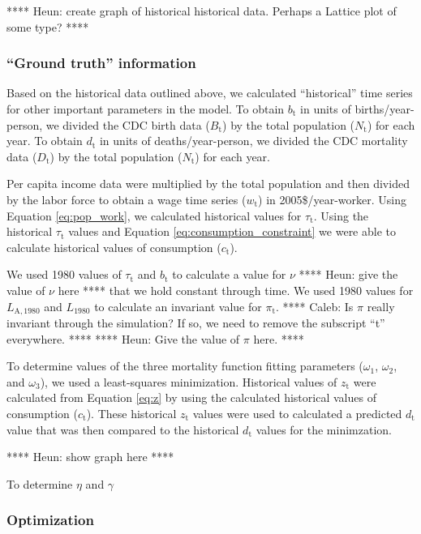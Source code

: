 \documentclass[letterpaper,12pt]{article}
\begin{document}
**** Heun: create graph of historical historical data. Perhaps a Lattice plot of some type? ****

\subsubsection{``Ground truth'' information}
Based on the historical data outlined above, we calculated ``historical'' time series for other important parameters in the model. To obtain $b_\mathrm{t}$ in units of births/year-person, we divided the CDC birth data ($B_\mathrm{t}$) by the total population ($N_\mathrm{t}$) for each year. To obtain $d_\mathrm{t}$ in units of deaths/year-person, we divided the CDC mortality data ($D_\mathrm{t}$) by the total population ($N_\mathrm{t}$) for each year.

Per capita income data were multiplied by the total population and then divided by the labor force to obtain a wage time series ($w_\mathrm{t}$) in 2005\$/year-worker. Using Equation \ref{eq:pop_work}, we calculated historical values for $\tau_\mathrm{t}$. Using the historical $\tau_\mathrm{t}$ values and Equation \ref{eq:consumption_constraint} we were able to calculate historical values of consumption ($c_\mathrm{t}$). 

We used 1980 values of $\tau_\mathrm{t}$ and $b_\mathrm{t}$ to calculate a value for $\nu$ **** Heun: give the value of $\nu$ here **** that we hold constant through time. We used 1980 values for $L_\mathrm{A,1980}$ and $L_{1980}$ to calculate an invariant value for $\pi_\mathrm{t}$. **** Caleb: Is $\pi$ really invariant through the simulation? If so, we need to remove the subscript ``t'' everywhere. **** **** Heun: Give the value of $\pi$ here. ****

To determine values of the three mortality function fitting parameters ($\omega_\mathrm{1}$, $\omega_\mathrm{2}$, and $\omega_\mathrm{3}$), we used a least-squares minimization. Historical values of $z_\mathrm{t}$ were calculated from Equation \ref{eq:z} by using the calculated historical values of consumption ($c_\mathrm{t}$). These historical $z_\mathrm{t}$ values were used to calculated a predicted $d_\mathrm{t}$ value that was then compared to the historical $d_\mathrm{t}$ values for the minimzation. 

**** Heun: show graph here ****

To determine $\eta$ and $\gamma$

\subsubsection{Optimization}
\end{document}

